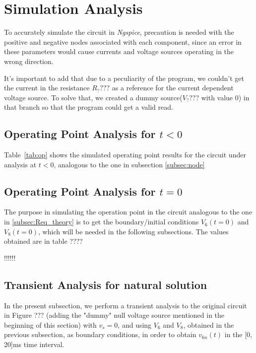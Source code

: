 \section{Simulation Analysis}
\label{sec:simulation}

To accurately simulate the circuit in \textit{Ngspice}, precaution is needed with the positive and negative nodes associated with each component, since an error in these parameters would cause currents and voltage sources operating in the wrong direction.

It's important to add that due to a peculiarity of the program, we couldn't get the current in the resistance $R_????$ as a reference for the current dependent voltage source. To solve that, we created a dummy source($V_????$ with value 0) in that branch so that the program could get a valid read.


\subsection{Operating Point Analysis for $t<0$}
\label{subsec:OP_t<0}

Table~\ref{tab:op} shows the simulated operating point results for the circuit under analysis at $t<0$, analogous to the one in subsection \ref{subsec:node}



\subsection{Operating Point Analysis for $t=0$}
\label{subsec:OP_t=0}


The purpose in simulating the operation point in the circuit analogous to the one in \ref{subsec:Req_theory} is to get the boundary/initial conditions $V_6(t=0)$ and $V_8(t=0)$, which will be needed in the following subsections. The values obtained are in table ????

!!!!!!



\subsection{Transient Analysis for natural solution}
\label{subsec:trans_nat}

In the present subsection, we perform a transient analysis to the original circuit in Figure ??? (adding the "dummy" null voltage source mentioned in the beginning of this section) with $v_s = 0$, and using $V_6$ and $V_8$, obtained in the previous subsection, as boundary conditions, in order to obtain $v_{6n}(t)$ in the [0, 20]ms time interval.

